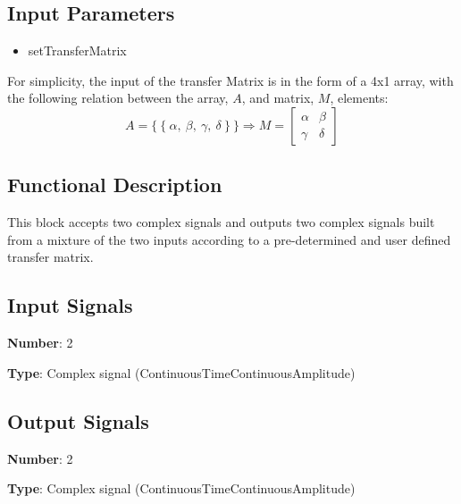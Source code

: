 \documentclass[../../sdf/tex/BPSK_system.tex]{subfiles}
\date{}
\begin{document}
\onlyinsubfile{\maketitle}

\subsection*{Input Parameters}

\begin{multicols}{2}
	\begin{itemize}
		\item setTransferMatrix
	\end{itemize}
\end{multicols}

For simplicity, the input of the transfer Matrix is in the form of a 4x1 array, with the following relation between the array, $A$, and matrix, $M$, elements:
\begin{equation}
A=\{~\{~\alpha,~\beta,~\gamma,~\delta~\}~\}\Rightarrow
M=
\begin{bmatrix}
\alpha & \beta \\
\gamma & \delta
\end{bmatrix}
\end{equation}

\subsection*{Functional Description}

This block accepts two complex signals and outputs two complex signals built from a mixture of the two inputs according to a pre-determined and user defined transfer matrix.


\subsection*{Input Signals}

\textbf{Number}: 2

\textbf{Type}: Complex signal (ContinuousTimeContinuousAmplitude)

\subsection*{Output Signals}

\textbf{Number}: 2

\textbf{Type}: Complex signal (ContinuousTimeContinuousAmplitude)
\end{document}
